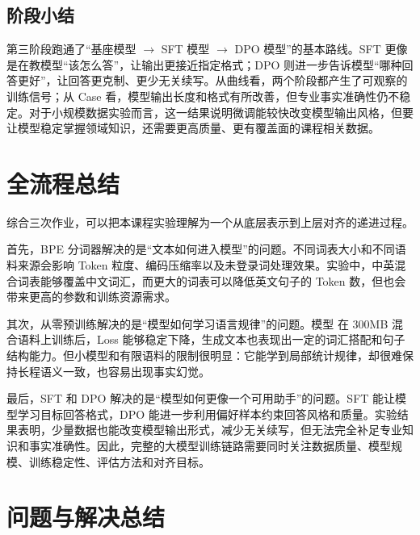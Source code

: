 \documentclass[a4paper,12pt]{ctexart}
\begin{document}
\subsection{阶段小结}

第三阶段跑通了“基座模型 $\rightarrow$ SFT 模型 $\rightarrow$ DPO 模型”的基本路线。SFT 更像是在教模型“该怎么答”，让输出更接近指定格式；DPO 则进一步告诉模型“哪种回答更好”，让回答更克制、更少无关续写。从曲线看，两个阶段都产生了可观察的训练信号；从 Case 看，模型输出长度和格式有所改善，但专业事实准确性仍不稳定。对于小规模数据实验而言，这一结果说明微调能较快改变模型输出风格，但要让模型稳定掌握领域知识，还需要更高质量、更有覆盖面的课程相关数据。

\section{全流程总结}

综合三次作业，可以把本课程实验理解为一个从底层表示到上层对齐的递进过程。

首先，BPE 分词器解决的是“文本如何进入模型”的问题。不同词表大小和不同语料来源会影响 Token 粒度、编码压缩率以及未登录词处理效果。实验中，中英混合词表能够覆盖中文词汇，而更大的词表可以降低英文句子的 Token 数，但也会带来更高的参数和训练资源需求。

其次，从零预训练解决的是“模型如何学习语言规律”的问题。模型 在 300MB 混合语料上训练后，Loss 能够稳定下降，生成文本也表现出一定的词汇搭配和句子结构能力。但小模型和有限语料的限制很明显：它能学到局部统计规律，却很难保持长程语义一致，也容易出现事实幻觉。

最后，SFT 和 DPO 解决的是“模型如何更像一个可用助手”的问题。SFT 能让模型学习目标回答格式，DPO 能进一步利用偏好样本约束回答风格和质量。实验结果表明，少量数据也能改变模型输出形式，减少无关续写，但无法完全补足专业知识和事实准确性。因此，完整的大模型训练链路需要同时关注数据质量、模型规模、训练稳定性、评估方法和对齐目标。

\section{问题与解决总结}

%
\end{document}
